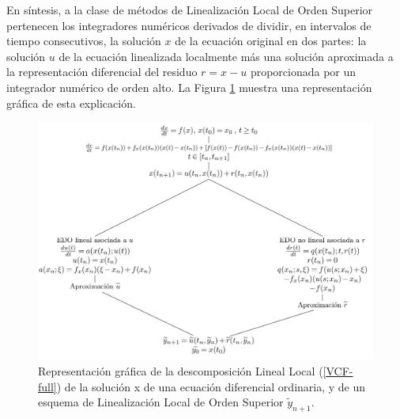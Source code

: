 En síntesis, a la clase de métodos de Linealización Local de Orden Superior pertenecen los integradores numéricos derivados de dividir, en intervalos de tiempo consecutivos, la solución $x$ de la ecuación original en dos partes: la solución $u$ de la ecuación linealizada localmente más una solución aproximada a la representación diferencial del residuo $r = x-u$ proporcionada por un integrador numérico de orden alto. La Figura \ref{fig:ll-graph} muestra una representación gráfica de esta explicación. 


\begin{figure}[ht]
	\includegraphics[scale=0.55]{Graphics/diagram-ll.jpg}
	\caption{Representación gráfica de la descomposición Lineal Local (\ref{VCF-full}) de la solución x de una ecuación diferencial ordinaria, y de un esquema de  Linealización Local de Orden Superior $\widetilde{y}_{n+1}$.}
	\label{fig:ll-graph}
\end{figure}

